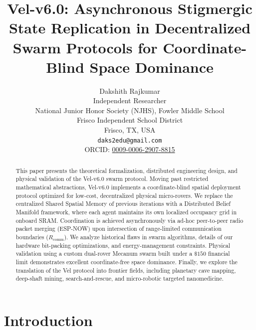 \documentclass[letterpaper, 10pt, conference]{IEEEtran}
\begin{document}
\title{\LARGE \bf Vel-v6.0: Asynchronous Stigmergic State Replication in Decentralized Swarm Protocols for Coordinate-Blind Space Dominance}

\author{
    Dakshith Rajkumar \\
    Independent Researcher \\
    National Junior Honor Society (NJHS), Fowler Middle School \\
    Frisco Independent School District \\
    Frisco, TX, USA \\
    \texttt{daks2edu@gmail.com} \\
    ORCID: \href{https://orcid.org/0009-0006-2907-8815}{0009-0006-2907-8815}
}

\maketitle
\thispagestyle{empty}
\pagestyle{empty}

\begin{abstract}
This paper presents the theoretical formalization, distributed engineering design, and physical validation of the Vel-v6.0 swarm protocol. Moving past restricted mathematical abstractions, Vel-v6.0 implements a coordinate-blind spatial deployment protocol optimized for low-cost, decentralized physical micro-rovers. We replace the centralized Shared Spatial Memory of previous iterations with a Distributed Belief Manifold framework, where each agent maintains its own localized occupancy grid in onboard SRAM. Coordination is achieved asynchronously via ad-hoc peer-to-peer radio packet merging (ESP-NOW) upon intersection of range-limited communication boundaries ($R_{\text{comm}}$). We analyze historical flaws in swarm algorithms, details of our hardware bit-packing optimizations, and energy-management constraints. Physical validation using a custom dual-rover Mecanum swarm built under a $\$150$ financial limit demonstrates excellent coordinate-free space dominance. Finally, we explore the translation of the Vel protocol into frontier fields, including planetary cave mapping, deep-shaft mining, search-and-rescue, and micro-robotic targeted nanomedicine.
\end{abstract}

\section{Introduction}
\label{sec:intro}
\end{document}
